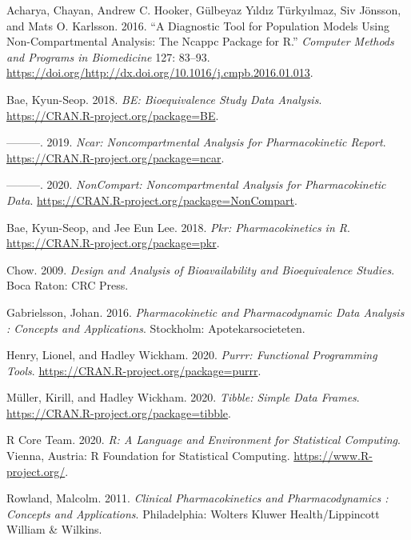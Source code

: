 \documentclass[
  12pt,
]{krantz}
\newlength{\cslhangindent}
\newenvironment{cslreferences}%
  {\setlength{\parindent}{0pt}%
  \everypar{\setlength{\hangindent}{\cslhangindent}}\ignorespaces}%
  {\par}
\begin{document}
\hypertarget{refs}{}
\begin{cslreferences}
\leavevmode\hypertarget{ref-Acharya201683}{}%
Acharya, Chayan, Andrew C. Hooker, Gülbeyaz Yıldız Türkyılmaz, Siv Jönsson, and Mats O. Karlsson. 2016. ``A Diagnostic Tool for Population Models Using Non-Compartmental Analysis: The Ncappc Package for R.'' \emph{Computer Methods and Programs in Biomedicine} 127: 83--93. \url{https://doi.org/http://dx.doi.org/10.1016/j.cmpb.2016.01.013}.

\leavevmode\hypertarget{ref-R-BE}{}%
Bae, Kyun-Seop. 2018. \emph{BE: Bioequivalence Study Data Analysis}. \url{https://CRAN.R-project.org/package=BE}.

\leavevmode\hypertarget{ref-R-ncar}{}%
---------. 2019. \emph{Ncar: Noncompartmental Analysis for Pharmacokinetic Report}. \url{https://CRAN.R-project.org/package=ncar}.

\leavevmode\hypertarget{ref-R-NonCompart}{}%
---------. 2020. \emph{NonCompart: Noncompartmental Analysis for Pharmacokinetic Data}. \url{https://CRAN.R-project.org/package=NonCompart}.

\leavevmode\hypertarget{ref-R-pkr}{}%
Bae, Kyun-Seop, and Jee Eun Lee. 2018. \emph{Pkr: Pharmacokinetics in R}. \url{https://CRAN.R-project.org/package=pkr}.

\leavevmode\hypertarget{ref-chow2009design}{}%
Chow. 2009. \emph{Design and Analysis of Bioavailability and Bioequivalence Studies}. Boca Raton: CRC Press.

\leavevmode\hypertarget{ref-gab}{}%
Gabrielsson, Johan. 2016. \emph{Pharmacokinetic and Pharmacodynamic Data Analysis : Concepts and Applications}. Stockholm: Apotekarsocieteten.

\leavevmode\hypertarget{ref-R-purrr}{}%
Henry, Lionel, and Hadley Wickham. 2020. \emph{Purrr: Functional Programming Tools}. \url{https://CRAN.R-project.org/package=purrr}.

\leavevmode\hypertarget{ref-R-tibble}{}%
Müller, Kirill, and Hadley Wickham. 2020. \emph{Tibble: Simple Data Frames}. \url{https://CRAN.R-project.org/package=tibble}.

\leavevmode\hypertarget{ref-R-base}{}%
R Core Team. 2020. \emph{R: A Language and Environment for Statistical Computing}. Vienna, Austria: R Foundation for Statistical Computing. \url{https://www.R-project.org/}.

\leavevmode\hypertarget{ref-tozer}{}%
Rowland, Malcolm. 2011. \emph{Clinical Pharmacokinetics and Pharmacodynamics : Concepts and Applications}. Philadelphia: Wolters Kluwer Health/Lippincott William \& Wilkins.


\end{cslreferences}
\end{document}
